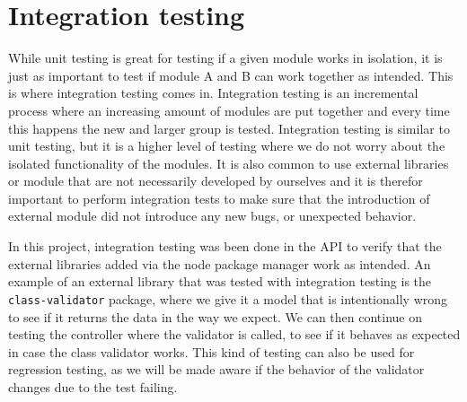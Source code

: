 \section{Integration testing}\label{sec:integrationTesting}
While unit testing is great for testing if a given module works in isolation, it is just as important to test if module A and B can work together as intended.
This is where integration testing comes in. 
Integration testing is an incremental process where an increasing amount of modules are put together and every time this happens the new and larger group is tested.
Integration testing is similar to unit testing, but it is a higher level of testing where we do not worry about the isolated functionality of the modules.
It is also common to use external libraries or module that are not necessarily developed by ourselves and it is therefor important to perform integration tests to make sure that the introduction of external module did not introduce any new bugs, or unexpected behavior. 

In this project, integration testing was been done in the API to verify that the external libraries added via the node package manager work as intended.
An example of an external library that was tested with integration testing is the \texttt{class-validator} package, where we give it a model that is intentionally wrong to see if it returns the data in the way we expect.
We can then continue on testing the controller where the validator is called, to see if it behaves as expected in case the class validator works.
This kind of testing can also be used for regression testing, as we will be made aware if the behavior of the validator changes due to the test failing.
